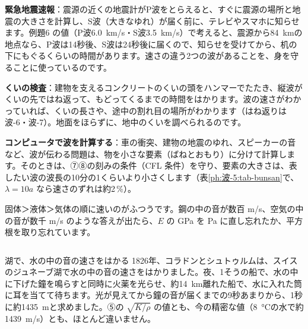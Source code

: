 \begin{phkougaku}
\textbf{緊急地震速報}：震源の近くの地震計がP波をとらえると、すぐに震源の場所と地震の大きさを計算し、S波（大きなゆれ）が届く前に、テレビやスマホに知らせます。例題6 の値（P波\qty{6.0}{km/s}・S波\qty{3.5}{km/s}）で考えると、震源から\qty{84}{km}の地点なら、P波は14秒後、S波は24秒後に届くので、知らせを受けてから、机の下にもぐるくらいの時間があります。速さの違う2つの波があることを、身を守ることに使っているのです。

\textbf{くいの検査}：建物を支えるコンクリートのくいの頭をハンマーでたたき、縦波がくいの先ではね返って、もどってくるまでの時間をはかります。波の速さがわかっていれば、くいの長さや、途中の割れ目の場所がわかります（はね返りは波-6・波-7）。地面をほらずに、地中のくいを調べられるのです。

\textbf{コンピュータで波を計算する}：車の衝突、建物の地震のゆれ、スピーカーの音など、波が伝わる問題は、物を小さな要素（ばねとおもり）に分けて計算します。そのときは、⑦⑧の刻みの条件（CFL 条件）を守り、要素の大きさは、表したい波の波長の10分の1くらいより小さくします（表\ref{ph:波-5:tab-bunsan}で、$\lambda=10a$ なら速さのずれは約2\,\%）。

\begin{phketa}[波の速さの目安]
固体＞液体＞気体の順に速いのがふつうです。鋼の中の音が数百 m/s、空気の中の音が数千 m/s のような答えが出たら、$E$ の GPa を Pa に直し忘れたか、平方根を取り忘れています。
\end{phketa}
\end{phkougaku}

\begin{column}{湖で、水の中の音の速さをはかる}
1826年、コラドンとシュトゥルムは、スイスのジュネーブ湖で水の中の音の速さをはかりました。夜、1そうの船で、水の中に下げた鐘を鳴らすと同時に火薬を光らせ、約\qty{14}{km}離れた船で、水に入れた筒に耳を当てて待ちます。光が見えてから鐘の音が届くまでの9秒あまりから、1秒に約\qty{1435}{m}と求めました。⑤の $\sqrt{K/\rho}$ の値とも、今の精密な値（\qty{8}{\celsius}の水で約\qty{1439}{m/s}）とも、ほとんど違いません。
\end{column}

